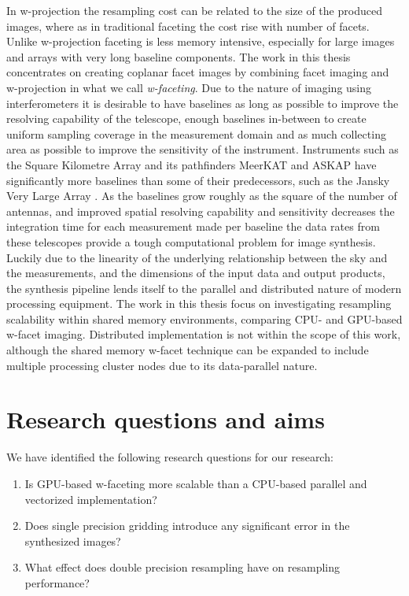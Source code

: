 In w-projection the resampling cost can be related to the size of the produced images, where as in traditional faceting the cost rise with number of facets. Unlike w-projection faceting 
is less memory intensive, especially for large images and arrays with very long baseline components. The work in this thesis concentrates on creating coplanar facet images by combining facet 
imaging and w-projection in what we call \textit{w-faceting}. Due to the nature of imaging using interferometers it is desirable to have baselines as long as possible to improve the resolving
capability of the telescope, enough baselines in-between to create uniform sampling coverage in the measurement domain and as much collecting area as possible to improve the sensitivity of 
the instrument. Instruments such as the Square Kilometre Array \cite{carilli2004science} and its pathfinders MeerKAT \cite{booth2009meerkat} and ASKAP \cite{johnston2008science} have significantly more
baselines than some of their predecessors, such as the Jansky Very Large Array \cite{2041-8205-739-1-L1}. As the baselines grow roughly as the square of the number of antennas, and improved spatial resolving 
capability and sensitivity decreases the integration time for each measurement made per baseline the data rates from these telescopes provide a tough computational problem for image synthesis. Luckily due to
the linearity of the underlying relationship between the sky and the measurements, and the dimensions of the input data and output products, the synthesis pipeline lends itself to the parallel and 
distributed nature of modern processing equipment. The work in this thesis focus on investigating resampling scalability within shared memory environments, comparing CPU- and GPU-based w-facet imaging.
Distributed implementation is not within the scope of this work, although the shared memory w-facet technique can be expanded to include multiple processing cluster nodes due to its data-parallel 
nature.
\section{Research questions and aims}
We have identified the following research questions for our research:
\begin{enumerate}
 \item Is GPU-based w-faceting more scalable than a CPU-based parallel and vectorized implementation?
 \item Does single precision gridding introduce any significant error in the synthesized images?
 \item What effect does double precision resampling have on resampling performance?
\end{enumerate}

